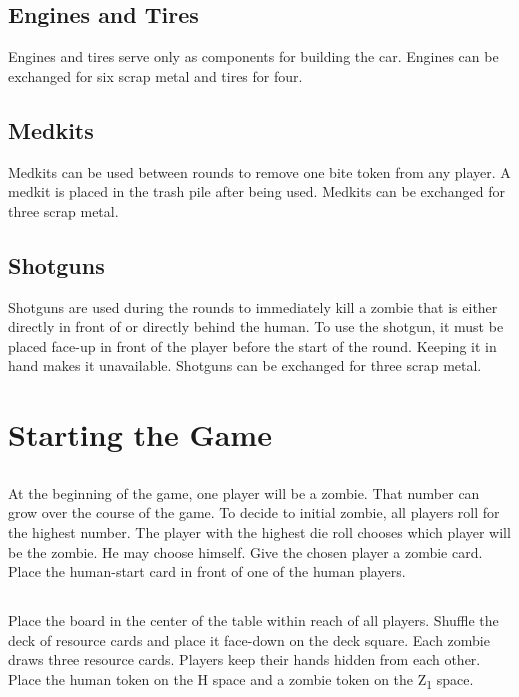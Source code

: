 \documentclass[12pt]{article} %
\begin{document}
\subsection{Engines and Tires}
Engines and tires serve only as components for building the car.  Engines can be exchanged for six scrap metal and tires for four.

\subsection{Medkits}
Medkits can be used between rounds to remove one bite token from any player.  A medkit is placed in the trash pile after being used.  Medkits can be exchanged for three scrap metal.

\subsection{Shotguns}
Shotguns are used during the rounds to immediately kill a zombie that is either directly in front of or directly behind the human.  To use the shotgun, it must be placed face-up in front of the player before the start of the round.  Keeping it in hand makes it unavailable.  Shotguns can be exchanged for three scrap metal.

\section{Starting the Game}

\subsection{}
At the beginning of the game, one player will be a zombie.  That number can grow over the course of the game.  To decide to initial zombie, all players roll for the highest number.  The player with the highest die roll chooses which player will be the zombie.  He may choose himself.  Give the chosen player a zombie card.  Place the human-start card in front of one of the human players.

\subsection{}
Place the board in the center of the table within reach of all players.  Shuffle the deck of resource cards and place it face-down on the deck square.  Each zombie draws three resource cards.  Players keep their hands hidden from each other.  Place the human token on the H space and a zombie token on the Z\textsubscript{1} space.
\end{document}
